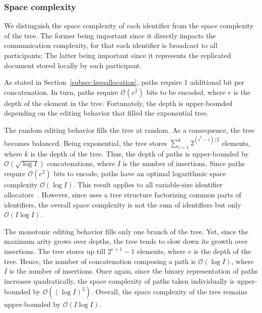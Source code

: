 
\subsubsection{Space complexity}

We distinguish the space complexity of each identifier from the space complexity
of the tree. The former being important since it directly impacts the
communication complexity, for that each identifier is broadcast to all
participants; The latter being important since it represents the replicated
document stored locally by each participant.

As stated in Section~\ref{subsec:lseqallocation}, paths require 1 additional bit
per concatenation. In turn, paths require $\mathcal{O}(e^2)$ bits to be encoded,
where $e$ is the depth of the element in the tree. Fortunately, the depth is
upper-bounded depending on the editing behavior that filled the exponential
tree.

The random editing behavior fills the tree at random. As a consequence, the tree
becomes balanced. Being exponential, the tree stores
$\textstyle\sum\nolimits_{i=1}^{k}{2^{(i^2-i)/2}}$ elements, where $k$ is the
depth of the tree. Thus, the depth of paths is upper-bounded by
$\mathcal{O}(\sqrt{\log I})$ concatenations, where $I$ is the number of
insertions. Since paths require $\mathcal{O}(e^2)$ bits to encode, paths have an
optimal logarithmic space complexity $\mathcal{O}(\log I)$. This result applies
to all variable-size identifier allocators~\cite{preguica2009commutative,
  weiss2009logoot}. However, since \LSEQ uses a tree structure factorizing
common parts of identifiers, the overall space complexity is not the sum of
identifiers but only $\mathcal{O}(I\log I)$.

The monotonic editing behavior fills only one branch of the tree. Yet, since the
maximum arity grows over depths, the tree tends to slow down its growth over
insertions. The tree stores up till $2^{e+1}-1$ elements, where $e$ is the depth
of the tree. Hence, the number of concatenation composing a path is
$\mathcal{O}(\log I)$, where $I$ is the number of insertions. Once again, since
the binary representation of paths increases quadratically, the space complexity
of paths taken individually is upper-bounded by $\mathcal{O}((\log I)^2)$.
Overall, the space complexity of the tree remains upper-bounded by
$\mathcal{O}(I\log I)$.

